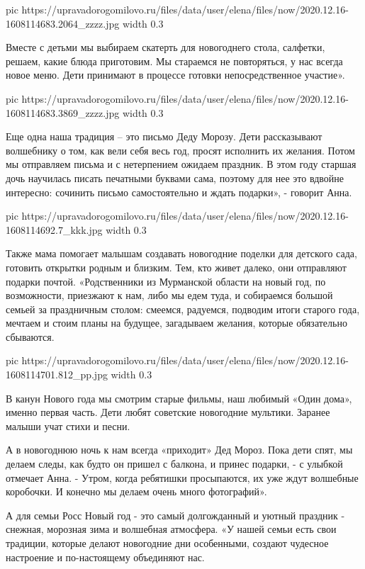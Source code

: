 \ifcmt
  pic https://upravadorogomilovo.ru/files/data/user/elena/files/now/2020.12.16-1608114683.2064_zzzz.jpg
  width 0.3
  
\fi


Вместе с детьми мы выбираем скатерть для новогоднего стола, салфетки, решаем,
какие блюда приготовим. Мы стараемся не повторяться, у нас всегда новое меню.
Дети принимают в процессе готовки непосредственное участие».

\ifcmt
  pic https://upravadorogomilovo.ru/files/data/user/elena/files/now/2020.12.16-1608114683.3869_zzzz.jpg
  width 0.3
  
\fi


Еще одна наша традиция – это письмо Деду Морозу. Дети рассказывают волшебнику о
том, как вели себя весь год, просят исполнить их желания.  Потом мы отправляем
письма и с нетерпением ожидаем праздник. В этом году старшая дочь научилась
писать печатными буквами сама, поэтому для нее это вдвойне интересно: сочинить
письмо самостоятельно и ждать подарки», - говорит Анна.

\ifcmt
  pic https://upravadorogomilovo.ru/files/data/user/elena/files/now/2020.12.16-1608114692.7_kkk.jpg
  width 0.3
  
\fi


Также мама помогает малышам создавать новогодние поделки для детского сада,
готовить открытки родным и близким. Тем, кто живет далеко, они отправляют
подарки почтой. «Родственники из Мурманской области на новый год, по
возможности, приезжают к нам, либо мы едем туда, и собираемся большой семьей за
праздничным столом: смеемся, радуемся, подводим итоги старого года, мечтаем и
стоим планы на будущее, загадываем желания, которые обязательно сбываются.

\ifcmt
  pic https://upravadorogomilovo.ru/files/data/user/elena/files/now/2020.12.16-1608114701.812_pp.jpg
  width 0.3
  
\fi


В канун Нового года мы смотрим старые фильмы, наш любимый «Один дома», именно
первая часть. Дети любят советские новогодние мультики. Заранее малыши учат
стихи и песни.

А в новогоднюю ночь к нам всегда «приходит» Дед Мороз. Пока дети спят, мы
делаем следы, как будто он пришел с балкона, и принес подарки, - с улыбкой
отмечает Анна. - Утром, когда ребятишки просыпаются, их уже ждут волшебные
коробочки. И конечно мы делаем очень много фотографий».

А для семьи Росс Новый год - это самый долгожданный и уютный праздник -
снежная, морозная зима и волшебная атмосфера. «У нашей семьи есть свои
традиции, которые делают новогодние дни особенными, создают чудесное настроение
и по-настоящему объединяют нас.

